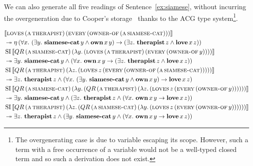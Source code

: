 We can also generate all five readings of Sentence~\ref{ex:siamese},
without incurring the overgeneration due to Cooper's
storage~\cite{burchardt2004computational} thanks to the ACG type
system\footnote{The overgenerating case is due to variable escaping its
  scope. However, such a term with a free occurrence of a variable would
  not be a well-typed closed term and so such a derivation does not
  exist.}.

\addtocounter{equation}{-1}
\NoChapterPrefix
\begin{align}
& \sem{\app{\abs{loves}}{(\ap{\abs{a}}{\abs{therapist}})}{(\ap{\abs{every}}{(\ap{\abs{owner-of}}{(\ap{\abs{a}}{\abs{siamese-cat}})})})}} \nonumber \\
&\tto \etaE{(\forall x.\ (\exists y.\ \ap{\obj{siamese-cat}}{y} \land \app{\obj{own}}{x}{y}) \to (\exists z.\ \ap{\obj{therapist}}{z} \land \app{\obj{love}}{x}{z}))} \\
\addtocounter{equation}{-1}
& \ap{\SI}{\sem{\app{QR}{(\ap{\abs{a}}{\abs{siamese-cat}})}{(\lam{y}{(\app{\abs{loves}}{(\ap{\abs{a}}{\abs{therapist}})}{(\ap{\abs{every}}{(\ap{\abs{owner-of}}{y})})})})}}} \nonumber \\
&\tto \exists y.\ \ap{\obj{siamese-cat}}{y} \land (\forall x.\ \app{\obj{own}}{x}{y} \to (\exists z.\ \ap{\obj{therapist}}{z} \land \app{\obj{love}}{x}{z})) \\
\addtocounter{equation}{-1}
& \ap{\SI}{\sem{\app{QR}{(\ap{\abs{a}}{\abs{therapist}})}{(\lam{z}{(\app{\abs{loves}}{z}{(\ap{\abs{every}}{(\ap{\abs{owner-of}}{(\ap{\abs{a}}{\abs{siamese-cat}})})})})})}}} \nonumber \\
&\tto \exists z.\ \ap{\obj{therapist}}{z} \land (\forall x.\ (\exists y.\ \ap{\obj{siamese-cat}}{y} \land \app{\obj{own}}{x}{y}) \to \app{\obj{love}}{x}{z}) \\
\addtocounter{equation}{-1}
& \ap{\SI}{\sem{\app{QR}{(\ap{\abs{a}}{\abs{siamese-cat}})}{(\lam{y}{(\app{QR}{(\ap{\abs{a}}{\abs{therapist}})}{(\lam{z}{(\app{\abs{loves}}{z}{(\ap{\abs{every}}{(\ap{\abs{owner-of}}{y})})})})})})}}} \nonumber \\
&\tto \exists y.\ \ap{\obj{siamese-cat}}{y} \land (\exists z.\ \ap{\obj{therapist}}{z} \land (\forall x.\ \app{\obj{own}}{x}{y} \to \app{\obj{love}}{x}{z})) \\
\addtocounter{equation}{-1}
& \ap{\SI}{\sem{\app{QR}{(\ap{\abs{a}}{\abs{therapist}})}{(\lam{z}{(\app{QR}{(\ap{\abs{a}}{\abs{siamese-cat}})}{(\lam{y}{(\app{\abs{loves}}{z}{(\ap{\abs{every}}{(\ap{\abs{owner-of}}{y})})})})})})}}} \nonumber \\
&\tto \exists z.\ \ap{\obj{therapist}}{z} \land (\exists y.\ \ap{\obj{siamese-cat}}{y} \land (\forall x.\ \app{\obj{own}}{x}{y} \to \app{\obj{love}}{x}{z}))
\end{align}
\ChapterPrefix

